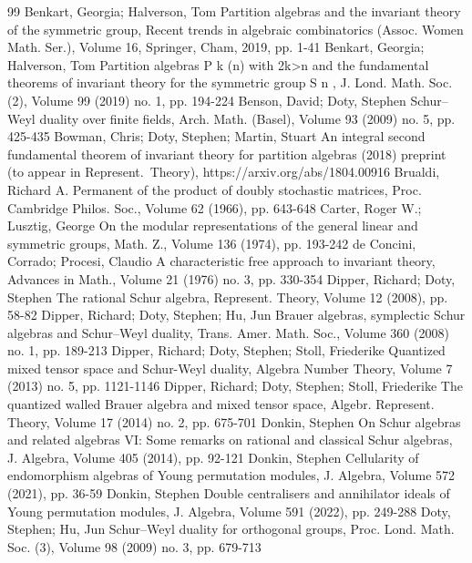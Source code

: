 \documentclass[10pt]{article}
\theoremstyle{definition}
\begin{document}
\begin{thebibliography}{99}
Benkart, Georgia; Halverson, Tom Partition algebras and the invariant theory of the symmetric group, Recent trends in algebraic combinatorics (Assoc. Women Math. Ser.), Volume 16, Springer, Cham, 2019, pp. 1-41
Benkart, Georgia; Halverson, Tom Partition algebras P k (n) with 2k>n and the fundamental theorems of invariant theory for the symmetric group S n , J. Lond. Math. Soc. (2), Volume 99 (2019) no. 1, pp. 194-224
Benson, David; Doty, Stephen Schur–Weyl duality over finite fields, Arch. Math. (Basel), Volume 93 (2009) no. 5, pp. 425-435
Bowman, Chris; Doty, Stephen; Martin, Stuart An integral second fundamental theorem of invariant theory for partition algebras (2018) preprint (to appear in Represent. Theory), https://arxiv.org/abs/1804.00916
Brualdi, Richard A. Permanent of the product of doubly stochastic matrices, Proc. Cambridge Philos. Soc., Volume 62 (1966), pp. 643-648
Carter, Roger W.; Lusztig, George On the modular representations of the general linear and symmetric groups, Math. Z., Volume 136 (1974), pp. 193-242
de Concini, Corrado; Procesi, Claudio A characteristic free approach to invariant theory, Advances in Math., Volume 21 (1976) no. 3, pp. 330-354
Dipper, Richard; Doty, Stephen The rational Schur algebra, Represent. Theory, Volume 12 (2008), pp. 58-82
Dipper, Richard; Doty, Stephen; Hu, Jun Brauer algebras, symplectic Schur algebras and Schur–Weyl duality, Trans. Amer. Math. Soc., Volume 360 (2008) no. 1, pp. 189-213
Dipper, Richard; Doty, Stephen; Stoll, Friederike Quantized mixed tensor space and Schur-Weyl duality, Algebra Number Theory, Volume 7 (2013) no. 5, pp. 1121-1146
Dipper, Richard; Doty, Stephen; Stoll, Friederike The quantized walled Brauer algebra and mixed tensor space, Algebr. Represent. Theory, Volume 17 (2014) no. 2, pp. 675-701
Donkin, Stephen On Schur algebras and related algebras VI: Some remarks on rational and classical Schur algebras, J. Algebra, Volume 405 (2014), pp. 92-121
Donkin, Stephen Cellularity of endomorphism algebras of Young permutation modules, J. Algebra, Volume 572 (2021), pp. 36-59
Donkin, Stephen Double centralisers and annihilator ideals of Young permutation modules, J. Algebra, Volume 591 (2022), pp. 249-288
Doty, Stephen; Hu, Jun Schur–Weyl duality for orthogonal groups, Proc. Lond. Math. Soc. (3), Volume 98 (2009) no. 3, pp. 679-713

\end{thebibliography}
\end{document}
